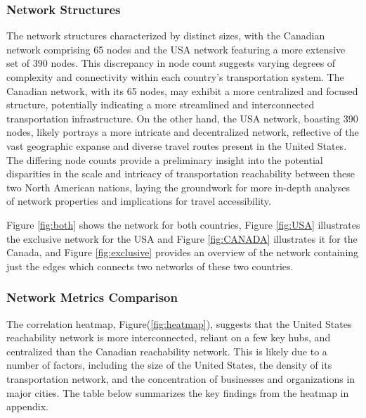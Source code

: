 \subsubsection{Network Structures}

The network structures characterized by distinct sizes, with the Canadian network comprising 65 nodes and the USA network featuring a more extensive set of 390 nodes. This discrepancy in node count suggests varying degrees of complexity and connectivity within each country's transportation system. The Canadian network, with its 65 nodes, may exhibit a more centralized and focused structure, potentially indicating a more streamlined and interconnected transportation infrastructure. On the other hand, the USA network, boasting 390 nodes, likely portrays a more intricate and decentralized network, reflective of the vast geographic expanse and diverse travel routes present in the United States. The differing node counts provide a preliminary insight into the potential disparities in the scale and intricacy of transportation reachability between these two North American nations, laying the groundwork for more in-depth analyses of network properties and implications for travel accessibility.

Figure \ref{fig:both} shows the network for both countries, Figure \ref{fig:USA} illustrates the exclusive network for the USA and Figure \ref{fig:CANADA} illustrates it for the Canada, and Figure \ref{fig:exclusive} provides an overview of the network containing just the edges which connects two networks of these two countries.


\subsubsection{Network Metrics Comparison}\label{metrics}
The correlation heatmap, Figure(\ref{fig:heatmap}), suggests that the United States reachability network is more interconnected, reliant on a few key hubs, and centralized than the Canadian reachability network. This is likely due to a number of factors, including the size of the United States, the density of its transportation network, and the concentration of businesses and organizations in major cities.
The table below summarizes the key findings from the heatmap in appendix.

